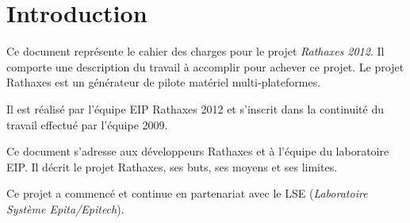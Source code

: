 \section{Introduction}

Ce document représente le cahier des charges pour le projet \emph{Rathaxes
2012}. Il comporte une description du travail à accomplir pour achever ce
projet. Le projet Rathaxes est un générateur de pilote matériel
multi-plateformes.

Il est réalisé par l'équipe EIP Rathaxes 2012 et s'inscrit dans la continuité
du travail effectué par l'équipe 2009.

Ce document s'adresse aux développeurs Rathaxes et à l'équipe du laboratoire
EIP. Il décrit le projet Rathaxes, ses buts, ses moyens et ses limites.

Ce projet a commencé et continue en partenariat avec le LSE (\emph{Laboratoire
Système Epita/Epitech}).
